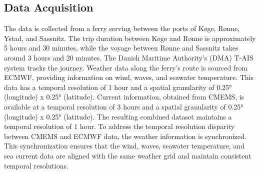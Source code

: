 \documentclass[]{interact}
\theoremstyle{plain}%
\theoremstyle{definition}
\theoremstyle{remark}
\begin{document}
\subsection{Data Acquisition}\label{sec:data_acquisition}

The data is collected from a ferry serving between the ports of K{\o}ge, R{\o}nne, Ystad, and Sassnitz. The trip duration between K{\o}ge and R{\o}nne is approximately 5 hours and 30 minutes, while the voyage between Rønne and Sassnitz takes around 3 hours and 20 minutes. The Danish Maritime Authority's (DMA) T-AIS system tracks the journey. Weather data along the ferry's route is sourced from ECMWF, providing information on wind, waves, and seawater temperature. This data has a temporal resolution of 1 hour and a spatial granularity of 0.25° (longitude) x 0.25° (latitude). Current information, obtained from CMEMS, is available at a temporal resolution of 3 hours and a spatial granularity of 0.25° (longitude) x 0.25° (latitude). The resulting combined dataset maintains a temporal resolution of 1 hour. To address the temporal resolution disparity between CMEMS and ECMWF data, the weather information is synchronized. This synchronization ensures that the wind, waves, seawater temperature, and sea current data are aligned with the same weather grid and maintain consistent temporal resolutions.\\
\end{document}
